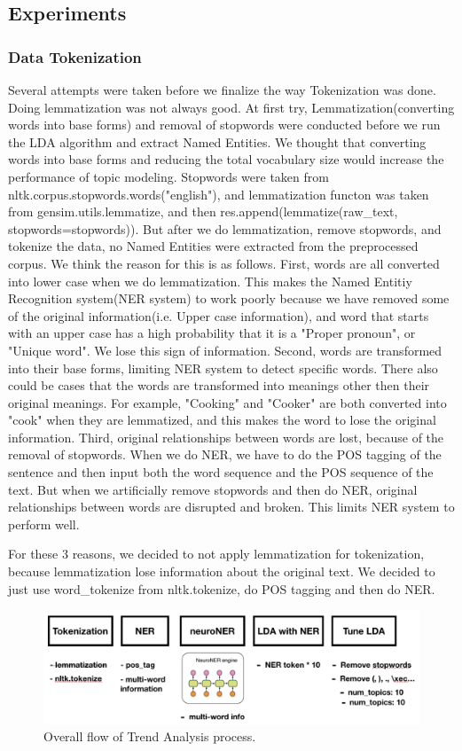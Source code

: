 \subsection{Experiments}
\subsubsection{Data Tokenization}
Several attempts were taken before we finalize the way Tokenization was done. Doing lemmatization was not always good.
At first try, Lemmatization(converting words into base forms) and removal of stopwords were conducted before we run the LDA algorithm and extract Named Entities. We thought that converting words into base forms and reducing the total vocabulary size would increase the performance of topic modeling. Stopwords were taken from nltk.corpus.stopwords.words("english"), and lemmatization functon was taken from
gensim.utils.lemmatize, and then res.append(lemmatize(raw\_text, stopwords=stopwords)). But after we do lemmatization, remove stopwords, and tokenize the data, no Named Entities were extracted from the preprocessed corpus. We think the reason for this is as follows. 
First, words are all converted into lower case when we do lemmatization. This makes the Named Entitiy Recognition system(NER system) to work poorly because we have removed some of the original information(i.e. Upper case information), and word that starts with an upper case has a high probability that it is a "Proper pronoun", or "Unique word". We lose this sign of information.
Second, words are transformed into their base forms, limiting NER system to detect specific words. There also could be cases that the words are transformed into meanings other then their original meanings. For example, "Cooking" and "Cooker" are both converted into "cook" when they are lemmatized, and this makes the word to lose the original information.
Third, original relationships between words are lost, because of the removal of stopwords. When we do NER, we have to do the POS tagging of the sentence and then input both the word sequence and the POS sequence of the text. But when we artificially remove stopwords and then do NER, original relationships between words are disrupted and broken. This limits NER system to perform well.

For these 3 reasons, we decided to not apply lemmatization for tokenization, because lemmatization lose information about the original text. We decided to just use word\_tokenize from nltk.tokenize, do POS tagging and then do NER.
\begin{figure}[!htbp]
  \centering
  \includegraphics[witdh=0.8\linewidth]{trend_overall.png}
  \caption{Overall flow of Trend Analysis process.}
\end{figure}

